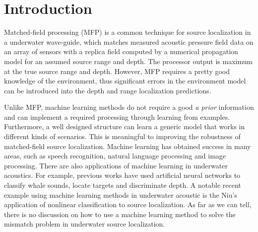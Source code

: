 \section{Introduction}
Matched-field processing (MFP) is a common technique for source localization in a underwater
wave-guide\cite{bucker1976use,baggeroer1988matched,baggeroer1993overview},
which matches measured acoustic pressure field data on an array of sensors with a replica field computed by a numerical propagation model for an assumed source range and depth. The processor output is maximum at the true source range and depth. However, MFP requires a pretty good knowledge of the environment, thus significant errors in the environment model can be introduced into the
depth and range localization predictions\cite{tolstoy1989sensitivity}.%

Unlike MFP, machine learning methods do not require a good \emph{a prior} information and can implement a required processing through learning from examples. Furthermore, a well designed structure can learn a generic model that works in different kinds of scenarios. This is meaningful to improving the robustness of matched-field source localization.
Machine learning  has obtained success in many areas, such as speech recognition, natural language processing and image processing. There are also applications of machine learning in underwater acoustics.
For example, previous works have used artificial neural networks to classify whale sounds\cite{thode2012automated}, locate targets\cite{steinberg1991neural} and discriminate depth\cite{ozard1991artificial}.
A notable recent example using machine learning methods in underwater acoustic is the Niu's application of nonlinear classification to source localization\cite{niu2017source}. As far as we can tell, there is no discussion on how to use a machine learning method to solve the mismatch problem in underwater source localization.

